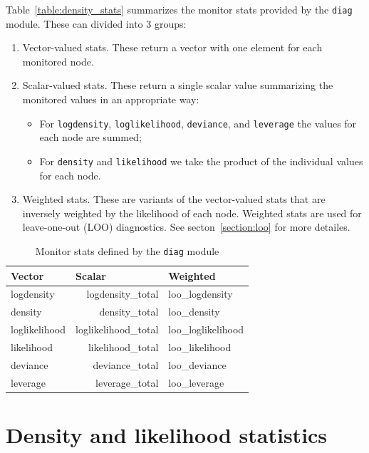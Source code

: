 \documentclass[11pt, a4paper, titlepage]{report}
\begin{document}
{Table~\ref{table:density_stats} summarizes the monitor stats provided
by the \texttt{diag} module. These can divided into 3 groups:
\begin{enumerate}
\item Vector-valued stats. These return a vector with one element
  for each monitored node.
\item Scalar-valued stats. These return a single scalar value
  summarizing the monitored values in an appropriate way:
  \begin{itemize}
  \item For \texttt{logdensity}, \texttt{loglikelihood}, \texttt{deviance},
    and \texttt{leverage} the values for each node are summed;
  \item For \texttt{density} and \texttt{likelihood} we take the product
    of the individual values for each node.
  \end{itemize}
\item Weighted stats. These are variants of the vector-valued stats
  that are inversely weighted by the likelihood of each node.
  Weighted stats are used for leave-one-out (LOO)
  diagnostics. See secton~\ref{section:loo} for more detailes.
\end{enumerate}

\begin{table}[htb]
  \centering
  \begin{tabular}{lrl}
  \hline
  Vector        & \multicolumn{1}{l}{Scalar} & Weighted \\
  \hline
  logdensity    &    logdensity\_total & loo\_logdensity \\
  density       &       density\_total & loo\_density \\
  loglikelihood & loglikelihood\_total & loo\_loglikelihood \\
  likelihood    &    likelihood\_total & loo\_likelihood \\
  deviance      &      deviance\_total & loo\_deviance \\
  leverage      &      leverage\_total & loo\_leverage \\
  \hline
  \end{tabular}
  \caption{\label{table:diag_stats} Monitor stats defined by the 
    \texttt{diag} module}
\end{table}

\section{Density and likelihood statistics}

}
\end{document}
